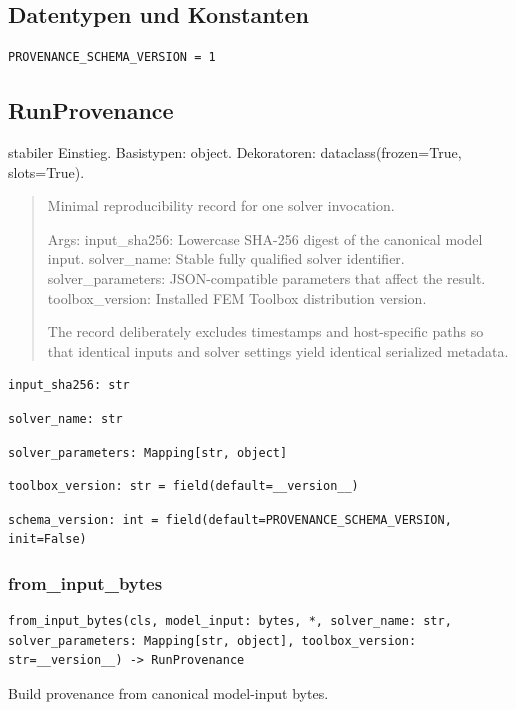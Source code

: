 \subsection*{Datentypen und Konstanten}
\begin{lstlisting}
PROVENANCE_SCHEMA_VERSION = 1
\end{lstlisting}
\subsection{RunProvenance}
stabiler Einstieg.
Basistypen: object. Dekoratoren: dataclass(frozen=True, slots=True).
\begin{quote}
Minimal reproducibility record for one solver invocation.\par Args:     input\_sha256: Lowercase SHA-256 digest of the canonical model input.     solver\_name: Stable fully qualified solver identifier.     solver\_parameters: JSON-compatible parameters that affect the result.     toolbox\_version: Installed FEM Toolbox distribution version.\par The record deliberately excludes timestamps and host-specific paths so that identical inputs and solver settings yield identical serialized metadata.
\end{quote}
\begin{lstlisting}
input_sha256: str
\end{lstlisting}
\begin{lstlisting}
solver_name: str
\end{lstlisting}
\begin{lstlisting}
solver_parameters: Mapping[str, object]
\end{lstlisting}
\begin{lstlisting}
toolbox_version: str = field(default=__version__)
\end{lstlisting}
\begin{lstlisting}
schema_version: int = field(default=PROVENANCE_SCHEMA_VERSION, init=False)
\end{lstlisting}
\subsubsection*{from\_input\_bytes}
\begin{lstlisting}
from_input_bytes(cls, model_input: bytes, *, solver_name: str, solver_parameters: Mapping[str, object], toolbox_version: str=__version__) -> RunProvenance
\end{lstlisting}
Build provenance from canonical model-input bytes.
